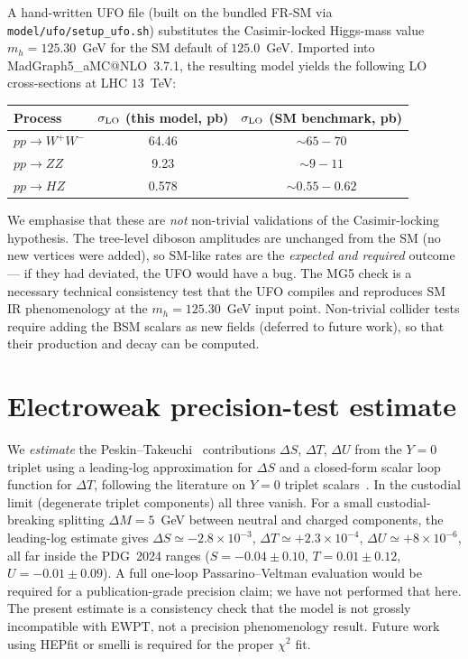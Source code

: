 \documentclass[11pt,a4paper]{article}
\begin{document}
A hand-written UFO file (built on the bundled FR-SM via
\texttt{model/ufo/setup\_ufo.sh}) substitutes the Casimir-locked
Higgs-mass value $m_h = 125.30$~GeV for the SM default of $125.0$~GeV.
Imported into MadGraph5\_aMC@NLO~3.7.1, the resulting model yields
the following LO cross-sections at LHC $13$~TeV:
\begin{center}
\begin{tabular}{l c c}
\toprule
Process & $\sigma_{\rm LO}$ (this model, pb) & $\sigma_{\rm LO}$ (SM benchmark, pb)\\
\midrule
$p p \to W^+ W^-$ & 64.46 & $\sim 65{-}70$ \\
$p p \to Z Z$     & 9.23  & $\sim 9{-}11$  \\
$p p \to H Z$     & 0.578 & $\sim 0.55{-}0.62$ \\
\bottomrule
\end{tabular}
\end{center}
We emphasise that these are \emph{not} non-trivial validations of the
Casimir-locking hypothesis. The tree-level diboson amplitudes are
unchanged from the SM (no new vertices were added), so SM-like rates are
the \emph{expected and required} outcome --- if they had deviated, the
UFO would have a bug. The MG5 check is a necessary technical consistency
test that the UFO compiles and reproduces SM IR phenomenology at the
$m_h = 125.30$~GeV input point. Non-trivial collider tests require
adding the BSM scalars as new fields (deferred to future work), so that
their production and decay can be computed.

\section{Electroweak precision-test estimate}

We \emph{estimate} the Peskin--Takeuchi~\cite{PeskinTakeuchi1992}
contributions $\Delta S$, $\Delta T$, $\Delta U$ from the $Y = 0$ triplet
using a leading-log approximation for $\Delta S$ and a closed-form
scalar loop function for $\Delta T$, following the literature on
$Y=0$ triplet scalars~\cite{ForshawRossSankey1991, Khan2018Triplet, Katayose2021TripletDM}. In the
custodial limit (degenerate triplet components) all three vanish.
For a small custodial-breaking splitting $\Delta M = 5$~GeV between
neutral and charged components, the leading-log estimate gives
\(\Delta S \simeq -2.8\times 10^{-3}\),
\(\Delta T \simeq +2.3\times 10^{-4}\),
\(\Delta U \simeq +8\times 10^{-6}\),
all far inside the PDG~2024 ranges
($S = -0.04 \pm 0.10$, $T = 0.01 \pm 0.12$, $U = -0.01 \pm 0.09$).
A full one-loop Passarino--Veltman evaluation would be required for a
publication-grade precision claim; we have not performed that here. The
present estimate is a consistency check that the model is not grossly
incompatible with EWPT, not a precision phenomenology result. Future
work using HEPfit or smelli is required for the proper $\chi^2$ fit.
\end{document}
